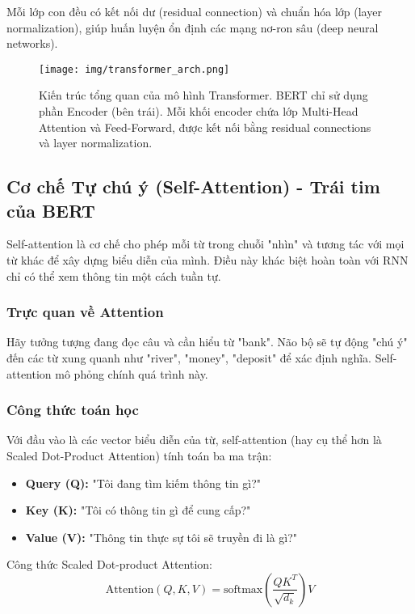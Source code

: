 Mỗi lớp con đều có kết nối dư (residual connection) và chuẩn hóa lớp (layer normalization), giúp huấn luyện ổn định các mạng nơ-ron sâu (deep neural networks).

\begin{figure}[H]
    \centering
    \texttt{[image: img/transformer\_arch.png]}
    \caption{Kiến trúc tổng quan của mô hình Transformer. BERT chỉ sử dụng phần Encoder (bên trái). Mỗi khối encoder chứa lớp Multi-Head Attention và Feed-Forward, được kết nối bằng residual connections và layer normalization.}
    \label{fig:transformer_architecture}
\end{figure}

\subsection{Cơ chế Tự chú ý (Self-Attention) - Trái tim của BERT}
\label{ssec:self_attention}
Self-attention là cơ chế cho phép mỗi từ trong chuỗi "nhìn" và tương tác với mọi từ khác để xây dựng biểu diễn của mình. Điều này khác biệt hoàn toàn với RNN chỉ có thể xem thông tin một cách tuần tự.

\subsubsection{Trực quan về Attention}
Hãy tưởng tượng đang đọc câu và cần hiểu từ "bank". Não bộ sẽ tự động "chú ý" đến các từ xung quanh như "river", "money", "deposit" để xác định nghĩa. Self-attention mô phỏng chính quá trình này.

\subsubsection{Công thức toán học}
Với đầu vào là các vector biểu diễn của từ, self-attention (hay cụ thể hơn là Scaled Dot-Product Attention) tính toán ba ma trận:
\begin{itemize}
    \item \textbf{Query (Q):} "Tôi đang tìm kiếm thông tin gì?"
    \item \textbf{Key (K):} "Tôi có thông tin gì để cung cấp?"
    \item \textbf{Value (V):} "Thông tin thực sự tôi sẽ truyền đi là gì?"
\end{itemize}

Công thức Scaled Dot-product Attention:
$$ \text{Attention}(Q, K, V) = \text{softmax}\left(\frac{QK^T}{\sqrt{d_k}}\right)V $$

